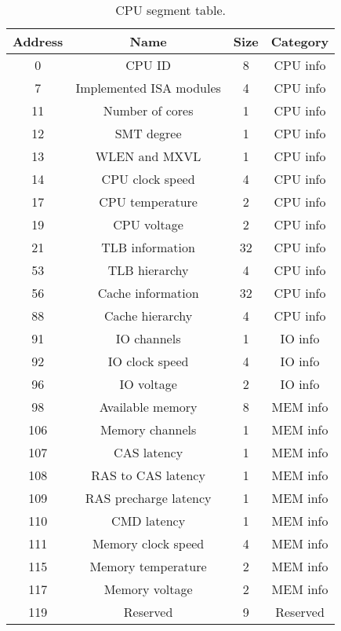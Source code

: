 \begin{table}[hbt!] %

    \begin{center}

    \begin{tabular}{|c|c|c|c|}

        \hline
        Address & Name & Size & Category\\
        \hline
        0 & CPU ID & 8 & CPU info\\
        \hline
        7 & Implemented ISA modules & 4 & CPU info\\
        \hline
        11 & Number of cores & 1 & CPU info\\
        \hline
        12 & SMT degree & 1 & CPU info\\
        \hline
        13 & WLEN and MXVL & 1 & CPU info\\
        \hline
        14 & CPU clock speed & 4 & CPU info\\
        \hline
        17 & CPU temperature & 2 & CPU info\\
        \hline
        19 & CPU voltage & 2 & CPU info\\
        \hline
        21 & TLB information & 32 & CPU info\\
        \hline
        53 & TLB hierarchy & 4 & CPU info\\
        \hline
        56 & Cache information & 32 & CPU info\\
        \hline
        88 & Cache hierarchy & 4 & CPU info\\
        \hline
        91 & IO channels & 1 & IO info\\
        \hline
        92 & IO clock speed & 4 & IO info\\
        \hline
        96 & IO voltage & 2 & IO info\\
        \hline
        98 & Available memory & 8 & MEM info\\
        \hline
        106 & Memory channels & 1 & MEM info\\
        \hline
        107 & CAS latency & 1 & MEM info\\
        \hline
        108 & RAS to CAS latency & 1 & MEM info\\
        \hline
        109 & RAS precharge latency & 1 & MEM info\\
        \hline
        110 & CMD latency & 1 & MEM info\\
        \hline
        111 & Memory clock speed & 4 & MEM info\\
        \hline
        115 & Memory temperature & 2 & MEM info\\
        \hline
        117 & Memory voltage & 2 & MEM info\\
        \hline
        119 & Reserved & 9 & Reserved\\
        \hline

    \end{tabular}

    \caption[CPU segment table]{CPU segment table.}

    \end{center}

\end{table}